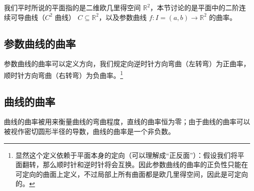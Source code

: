 
\begin{issues}
\issueDraft
\end{issues}


我们平时所说的平面指的是二维欧几里得空间 $\mathbb{R}^2$，本节讨论的是平面中的二阶连续可导曲线（$C^2$ 曲线） $C \subseteq \mathbb{R}^2$，以及参数曲线 $f: I = (a, b) \to \mathbb{R}^2$ 的曲率。

\subsection{参数曲线的曲率}

参数曲线的曲率可以定义方向，我们规定向逆时针方向弯曲（左转弯）为正曲率，顺时针方向弯曲（右转弯）为负曲率。\footnote{显然这个定义依赖于平面本身的定向（可以理解成“正反面”）：假设我们将平面翻转，那么顺时针和逆时针将会互换。因此参数曲线的曲率的正负性只能在可定向的曲面上定义，不过局部上所有曲面都是欧几里得空间，因此是可定向的。}

\subsection{曲线的曲率}

曲线的曲率被用来衡量曲线的弯曲程度，直线的曲率恒为零；由于曲线的曲率可以被视作密切圆形半径的导数，曲线的曲率是一个非负数。